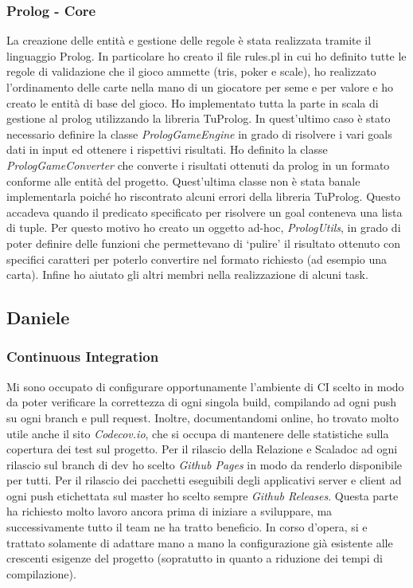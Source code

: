 \subsubsection{Prolog - Core}
La creazione delle entità e gestione delle regole è stata realizzata tramite il linguaggio Prolog.
In particolare ho creato il file rules.pl in cui ho definito tutte le regole di validazione che il gioco ammette (tris, poker e scale), ho realizzato l’ordinamento delle carte nella mano di un giocatore per seme e per valore e ho creato le entità di base del gioco.
Ho implementato tutta la parte in scala di gestione al prolog utilizzando la libreria TuProlog.
In quest'ultimo caso è stato necessario definire la classe \textit{PrologGameEngine} in grado di risolvere i vari goals dati in input ed ottenere i rispettivi risultati.
Ho definito la classe \textit{PrologGameConverter} che converte i risultati ottenuti da prolog in un formato conforme alle entità del progetto.
Quest’ultima classe non è stata banale implementarla poiché ho riscontrato alcuni errori della libreria TuProlog.
Questo accadeva quando il predicato specificato per risolvere un goal conteneva una lista di tuple.
Per questo motivo ho creato un oggetto ad-hoc, \textit{PrologUtils}, in grado di poter definire delle funzioni che permettevano di ‘pulire’ il risultato ottenuto con specifici caratteri per poterlo convertire nel formato richiesto (ad esempio una carta).
Infine ho aiutato gli altri membri nella realizzazione di alcuni task.
\subsection{Daniele}
\subsubsection{Continuous Integration}
Mi sono occupato di configurare opportunamente l'ambiente di CI scelto in modo da poter verificare la correttezza di ogni singola build, compilando ad ogni push su ogni branch e pull request.
Inoltre, documentandomi online, ho trovato molto utile anche il sito \textit{Codecov.io}, che si occupa di mantenere delle statistiche sulla copertura dei test sul progetto.
Per il rilascio della Relazione e Scaladoc ad ogni rilascio sul branch di dev ho scelto \textit{Github Pages} in modo da renderlo disponibile per tutti.
Per il rilascio dei pacchetti eseguibili degli applicativi server e client ad ogni push etichettata sul master ho scelto sempre \textit{Github Releases}.
Questa parte ha richiesto molto lavoro ancora prima di iniziare a sviluppare, ma successivamente tutto il team ne ha tratto beneficio.
In corso d'opera, si e trattato solamente di adattare mano a mano la configurazione già esistente alle crescenti esigenze del progetto (sopratutto in quanto a riduzione dei tempi di compilazione).
